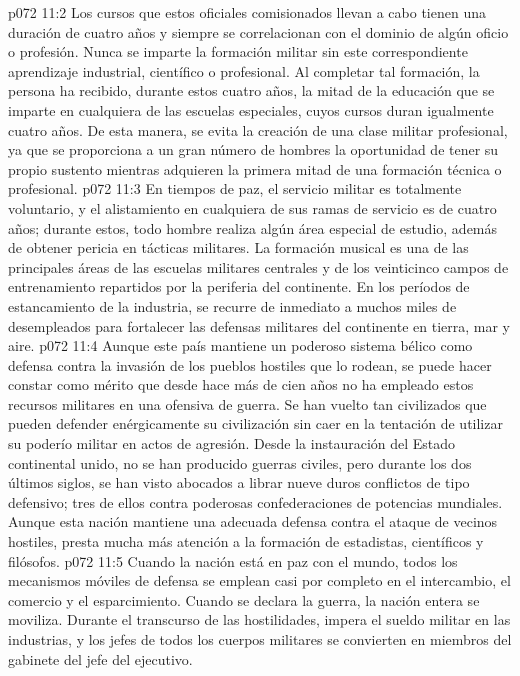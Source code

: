 \vs p072 11:2 Los cursos que estos oficiales comisionados llevan a cabo tienen una duración de cuatro años y siempre se correlacionan con el dominio de algún oficio o profesión. Nunca se imparte la formación militar sin este correspondiente aprendizaje industrial, científico o profesional. Al completar tal formación, la persona ha recibido, durante estos cuatro años, la mitad de la educación que se imparte en cualquiera de las escuelas especiales, cuyos cursos duran igualmente cuatro años. De esta manera, se evita la creación de una clase militar profesional, ya que se proporciona a un gran número de hombres la oportunidad de tener su propio sustento mientras adquieren la primera mitad de una formación técnica o profesional.
\vs p072 11:3 En tiempos de paz, el servicio militar es totalmente voluntario, y el alistamiento en cualquiera de sus ramas de servicio es de cuatro años; durante estos, todo hombre realiza algún área especial de estudio, además de obtener pericia en tácticas militares. La formación musical es una de las principales áreas de las escuelas militares centrales y de los veinticinco campos de entrenamiento repartidos por la periferia del continente. En los períodos de estancamiento de la industria, se recurre de inmediato a muchos miles de desempleados para fortalecer las defensas militares del continente en tierra, mar y aire.
\vs p072 11:4 \pc Aunque este país mantiene un poderoso sistema bélico como defensa contra la invasión de los pueblos hostiles que lo rodean, se puede hacer constar como mérito que desde hace más de cien años no ha empleado estos recursos militares en una ofensiva de guerra. Se han vuelto tan civilizados que pueden defender enérgicamente su civilización sin caer en la tentación de utilizar su poderío militar en actos de agresión. Desde la instauración del Estado continental unido, no se han producido guerras civiles, pero durante los dos últimos siglos, se han visto abocados a librar nueve duros conflictos de tipo defensivo; tres de ellos contra poderosas confederaciones de potencias mundiales. Aunque esta nación mantiene una adecuada defensa contra el ataque de vecinos hostiles, presta mucha más atención a la formación de estadistas, científicos y filósofos.
\vs p072 11:5 Cuando la nación está en paz con el mundo, todos los mecanismos móviles de defensa se emplean casi por completo en el intercambio, el comercio y el esparcimiento. Cuando se declara la guerra, la nación entera se moviliza. Durante el transcurso de las hostilidades, impera el sueldo militar en las industrias, y los jefes de todos los cuerpos militares se convierten en miembros del gabinete del jefe del ejecutivo.
